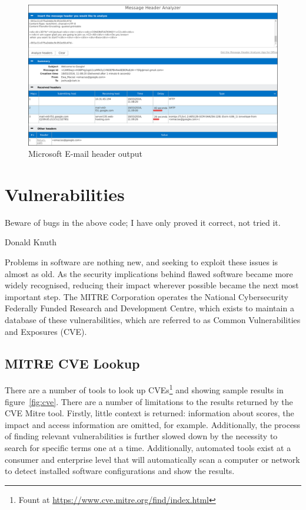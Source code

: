 \begin{figure}

	\centering \includegraphics[width=0.9\linewidth]{microsoft-header}

\caption{Microsoft E-mail header output} \label{fig:mic}\end{figure}

\section{Vulnerabilities}

\epigraph{Beware of bugs in the above code; I have only proved it correct, not tried it.}{Donald Knuth}

Problems in software are nothing new, and seeking to exploit these issues is
almost as old.   As the security implications behind flawed software became more
widely recognised, reducing their impact wherever possible became the next most
important step.  The MITRE Corporation operates the National Cybersecurity
Federally Funded Research and Development Centre, which exists to maintain a
database of these vulnerabilities, which are referred to as Common
Vulnerabilities and Exposures (CVE).

\subsection{MITRE CVE Lookup}\label{sec:mit}

There are a number of tools to look up CVEs\footnote{Fount at
	\url{https://www.cve.mitre.org/find/index.html}} and showing sample
results in figure~\ref{fig:cve}.  There are a number of limitations to the
results returned by the CVE Mitre tool.  Firstly, little context is returned:
information about scores, the impact and access information are omitted, for
example.  Additionally, the process of finding relevant vulnerabilities is
further slowed down by the necessity to search for specific terms one at a
time.  Additionally, automated tools exist at a consumer and enterprise level
that will automatically scan a computer or network to detect installed software
configurations and show the results.

